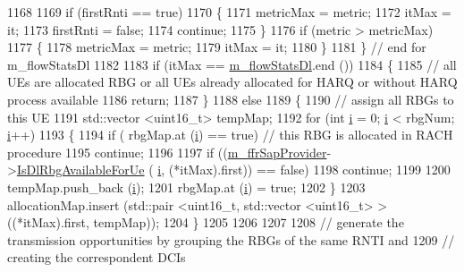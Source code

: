\begin{DoxyCode}
1168 
1169       \textcolor{keywordflow}{if} (firstRnti == \textcolor{keyword}{true})
1170         \{
1171           metricMax = metric;
1172           itMax = it;
1173           firstRnti = \textcolor{keyword}{false};
1174           \textcolor{keywordflow}{continue};
1175         \}
1176       \textcolor{keywordflow}{if} (metric > metricMax)
1177         \{
1178           metricMax = metric;
1179           itMax = it;
1180         \}
1181     \} \textcolor{comment}{// end for m\_flowStatsDl}
1182 
1183   \textcolor{keywordflow}{if} (itMax == \hyperlink{classns3_1_1TdTbfqFfMacScheduler_a077474dfdd0b794b6e274954e049e0c4}{m\_flowStatsDl}.end ())
1184     \{
1185       \textcolor{comment}{// all UEs are allocated RBG or all UEs already allocated for HARQ or without HARQ process available}
1186       \textcolor{keywordflow}{return};
1187     \}
1188   \textcolor{keywordflow}{else}
1189     \{
1190       \textcolor{comment}{// assign all RBGs to this UE}
1191       std::vector <uint16\_t> tempMap;
1192       \textcolor{keywordflow}{for} (\textcolor{keywordtype}{int} \hyperlink{bernuolliDistribution_8m_a6f6ccfcf58b31cb6412107d9d5281426}{i} = 0; \hyperlink{bernuolliDistribution_8m_a6f6ccfcf58b31cb6412107d9d5281426}{i} < rbgNum; \hyperlink{bernuolliDistribution_8m_a6f6ccfcf58b31cb6412107d9d5281426}{i}++)
1193         \{
1194           \textcolor{keywordflow}{if} ( rbgMap.at (\hyperlink{bernuolliDistribution_8m_a6f6ccfcf58b31cb6412107d9d5281426}{i}) == \textcolor{keyword}{true}) \textcolor{comment}{// this RBG is allocated in RACH procedure}
1195             \textcolor{keywordflow}{continue};
1196 
1197           \textcolor{keywordflow}{if} ((\hyperlink{classns3_1_1TdTbfqFfMacScheduler_a9db8ce15b6803fe859e5c2908cd00e14}{m\_ffrSapProvider}->\hyperlink{classns3_1_1LteFfrSapProvider_a91f4de3c794d2a32fae5bcfafd88b6fa}{IsDlRbgAvailableForUe} (
      \hyperlink{bernuolliDistribution_8m_a6f6ccfcf58b31cb6412107d9d5281426}{i}, (*itMax).first)) == \textcolor{keyword}{false})
1198             \textcolor{keywordflow}{continue};
1199 
1200           tempMap.push\_back (\hyperlink{bernuolliDistribution_8m_a6f6ccfcf58b31cb6412107d9d5281426}{i});
1201           rbgMap.at (\hyperlink{bernuolliDistribution_8m_a6f6ccfcf58b31cb6412107d9d5281426}{i}) = \textcolor{keyword}{true};
1202         \}
1203       allocationMap.insert (std::pair <uint16\_t, std::vector <uint16\_t> > ((*itMax).first, tempMap));
1204     \}
1205 
1206 
1207 
1208   \textcolor{comment}{// generate the transmission opportunities by grouping the RBGs of the same RNTI and}
1209   \textcolor{comment}{// creating the correspondent DCIs}

\end{DoxyCode}
